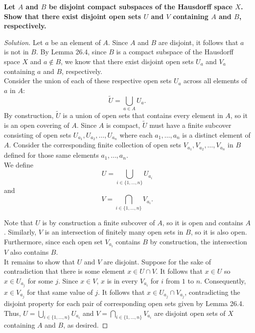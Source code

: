 \documentclass[11pt]{article}
\newenvironment{solution}
  {\renewcommand\qedsymbol{$\blacksquare$}\begin{proof}[Solution]}
  {\end{proof}}
\begin{document}
\textbf{Let $A$ and $B$ be disjoint compact subspaces of the Hausdorff space $X$. Show that there exist disjoint
open sets $U$ and $V$ containing $A$ and $B$, respectively.}

\begin{solution}
Let $a$ be an element of $A$. Since $A$ and $B$ are disjoint, it follows that $a$ is not in $B$. By Lemma 26.4, since 
$B$ is a compact subspace of the Hausdorff space $X$ and $a \notin B$, we know that there exist disjoint open sets $U_a$ and $V_a$ containing $a$ and $B$, respectively. 
\\

Consider the union of each of these respective open sets $U_a$ across all elements of $a$ in $A$:
\[
	\tilde{U} = \bigcup_{a \in A} U_a.
\]
By construction, $\tilde{U}$ is a union of open sets that contains every element in $A$, so it is an open covering of $A$. Since $A$ is compact, $\tilde{U}$ must have a finite
subcover consisting of open sets $U_{a_1}, U_{a_2}, \dots, U_{a_n}$ where each $a_1, \dots, a_n$ is a distinct element of $A$. Consider the 
corresponding finite collection of open sets $V_{a_1}, V_{a_2}, \dots, V_{a_n}$ in $B$ defined for those same elements $a_1, \dots, a_n$. \\


We define 
\[
	U = \bigcup_{i \in \{ 1, \dots, n \}} U_{a_i}
\]
and 
\[
	V = \bigcap_{i \in \{ 1, \dots, n \}} V_{a_i}.
\]

Note that $U$ is by construction a finite subcover of $A$, so it is open and contains $A$. 
Similarly, $V$ is an intersection of finitely many open sets in $B$, so it is also open. Furthermore, since each open set $V_{a_i}$ contains $B$ by construction, the intersection $V$ also contains $B$. \\

It remains to show that $U$ and $V$ are disjoint. Suppose for the sake of contradiction that there is some element $x \in U \cap V$. It follows that $x \in U$ so $x \in U_{a_j}$ for some $j$. Since $x \in V$, $x$ is in every $V_{a_i}$ for $i$ from $1$ to $n$. Consequently,
$x \in V_{a_j}$ for that same value of $j$. It follows that $x \in U_{a_j} \cap V_{a_j}$, contradicting the disjoint property for each pair of corresponding open sets given by Lemma 26.4. \\

Thus, $U = \bigcup\limits_{i \in \{ 1, \dots, n \}} U_{a_i}$ and $V = \bigcap\limits_{i \in \{ 1, \dots, n \}} V_{a_i}$ are disjoint open sets of $X$ containing $A$ and $B$, as desired.
\end{solution}
\end{document}

